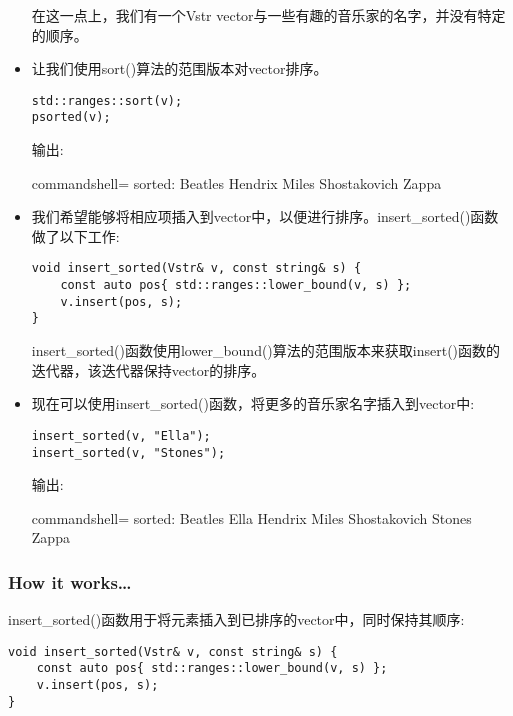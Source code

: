 \begin{itemize}
在这一点上，我们有一个Vstr vector与一些有趣的音乐家的名字，并没有特定的顺序。

\item 
让我们使用sort()算法的范围版本对vector排序。

\begin{lstlisting}[style=styleCXX]
std::ranges::sort(v);
psorted(v);
\end{lstlisting}

输出:

\begin{tcblisting}{commandshell={}}
sorted: Beatles Hendrix Miles Shostakovich Zappa
\end{tcblisting}

\item 
我们希望能够将相应项插入到vector中，以便进行排序。insert\_sorted()函数做了以下工作:

\begin{lstlisting}[style=styleCXX]
void insert_sorted(Vstr& v, const string& s) {
	const auto pos{ std::ranges::lower_bound(v, s) };
	v.insert(pos, s);
}
\end{lstlisting}

insert\_sorted()函数使用lower\_bound()算法的范围版本来获取insert()函数的迭代器，该迭代器保持vector的排序。

\item 
现在可以使用insert\_sorted()函数，将更多的音乐家名字插入到vector中:

\begin{lstlisting}[style=styleCXX]
insert_sorted(v, "Ella");
insert_sorted(v, "Stones");
\end{lstlisting}

输出:

\begin{tcblisting}{commandshell={}}
sorted: Beatles Ella Hendrix Miles Shostakovich Stones Zappa
\end{tcblisting}
\end{itemize}

\subsubsection{How it works…}

insert\_sorted()函数用于将元素插入到已排序的vector中，同时保持其顺序:

\begin{lstlisting}[style=styleCXX]
void insert_sorted(Vstr& v, const string& s) {
	const auto pos{ std::ranges::lower_bound(v, s) };
	v.insert(pos, s);
}
\end{lstlisting}

